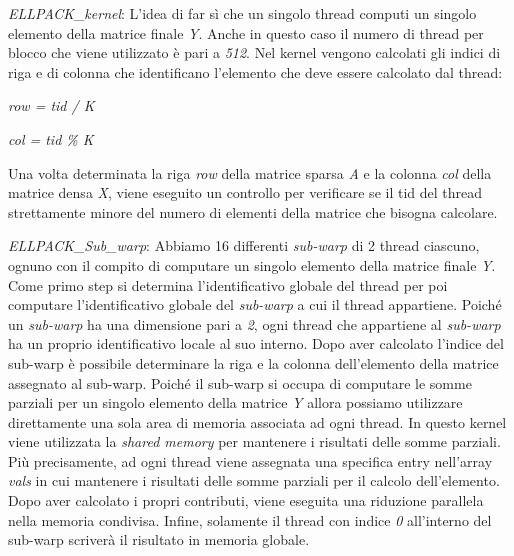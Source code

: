 \documentclass{article}
\begin{document}
\begin{itemize}

\item \textit{ELLPACK\_kernel}:
    L'idea di far sì che un singolo thread computi un singolo elemento della matrice finale \textit{Y}. Anche in questo caso il numero di thread per blocco che viene utilizzato è pari a \textit{512}.
    Nel kernel vengono calcolati gli indici di riga e di colonna che identificano l'elemento che deve essere calcolato dal thread:

    
\begin{center}
\item \textit{row = tid / K}
\item \textit{col = tid \% K}
\end{center}

    Una volta determinata la riga \textit{row} della matrice sparsa \textit{A} e la colonna \textit{col} della matrice densa \textit{X}, viene eseguito un controllo per verificare se il tid del thread strettamente minore del numero di elementi della matrice che bisogna calcolare.
    
\item \textit{ELLPACK\_Sub\_warp}:
Abbiamo 16 differenti \textit{sub-warp} di 2 thread ciascuno, ognuno con il compito di computare un singolo elemento della matrice finale \textit{Y}. Come primo step si determina l'identificativo globale del thread per poi computare l'identificativo globale del \textit{sub-warp} a cui il thread appartiene. Poiché un \textit{sub-warp} ha una dimensione pari a \textit{2}, ogni thread che appartiene al \textit{sub-warp} ha un proprio identificativo locale al suo interno. Dopo aver calcolato l'indice del sub-warp è possibile determinare la riga e la colonna dell'elemento della matrice assegnato al sub-warp. Poiché il sub-warp si occupa di computare le somme parziali per un singolo elemento della matrice \textit{Y} allora possiamo utilizzare direttamente una sola area di memoria associata ad ogni thread. In questo kernel viene utilizzata la \textit{shared memory} per mantenere i risultati delle somme parziali. Più precisamente, ad ogni thread viene assegnata una specifica entry nell'array \textit{vals} in cui mantenere i risultati delle somme parziali per il calcolo dell'elemento. Dopo aver calcolato i propri contributi, viene eseguita una riduzione parallela nella memoria condivisa. Infine, solamente il thread con indice \textit{0} all'interno del sub-warp scriverà il risultato in memoria globale.
\end{itemize}
\end{document}
